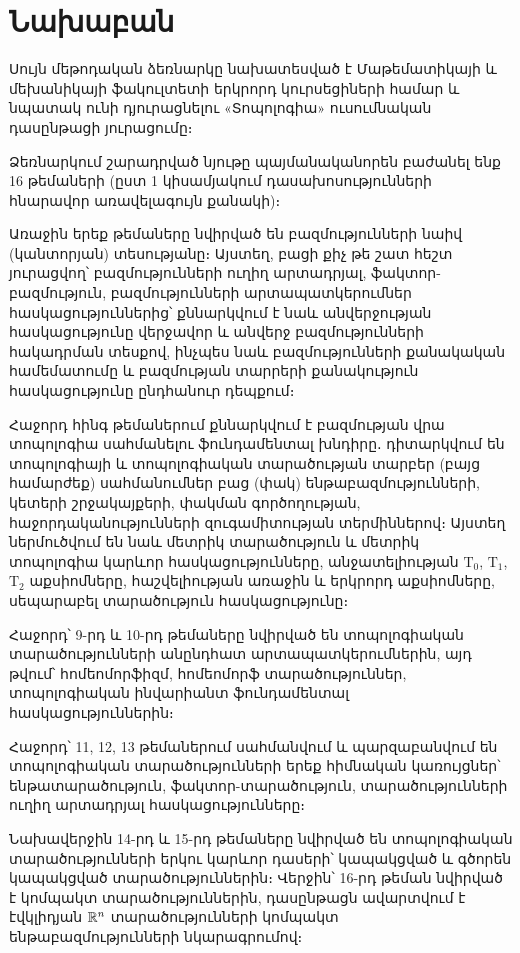 \documentclass[./main.tex]{subfiles}
\begin{document}
\onehalfspacing
\section*{Նախաբան}\label{sec:intro}
\par
Սույն մեթոդական ձեռնարկը նախատեսված է Մաթեմատիկայի և մեխանիկայի ֆակուլտետի երկրորդ կուրսեցիների համար և նպատակ ունի դյուրացնելու «Տոպո\-լոգիա» ուսումնական դասընթացի յուրացումը։
\par Ձեռնարկում շարադրված նյութը պայմանականորեն բաժանել ենք 16 թեմաների (ըստ 1 կիսամյակում դասախոսությունների հնարավոր առավելագույն քանակի)։
\par Առաջին երեք թեմաները նվիրված են բազմությունների նաիվ (կանտորյան) տեսությանը։ Այստեղ, բացի քիչ թե շատ հեշտ յուրացվող՝ բազմությունների ուղիղ արտադրյալ, ֆակտոր-բազմություն, բազմությունների արտապատկերումներ հաս\-կա\-ցու\-թյուն\-ներից՝ քննարկվում է նաև անվերջության հասկացությունը վերջավոր և անվերջ բազմությունների հակադրման տեսքով, ինչպես նաև բազմությունների քանակական համեմատումը և բազմության տարրերի քանակություն հասկացու\-թյունը ընդհանուր դեպքում։
\par Հաջորդ հինգ թեմաներում քննարկվում է բազմության վրա տոպոլոգիա սահմանե\-լու ֆունդամենտալ խնդիրը․ դիտարկվում են տոպոլոգիայի և տոպոլոգիական տա\-րա\-ծու\-թյան տարբեր (բայց համարժեք) սահմանումներ բաց (փակ) ենթա\-բազմու\-թյուն\-ների, կետերի շրջակայքերի, փակման գործողության, հաջորդականություն\-ների զուգամիտության տերմիններով։ Այստեղ ներմուծվում են նաև մետրիկ տարա\-ծու\-թյուն և մետրիկ տոպոլոգիա կարևոր հասկացությունները, անջատելի\-ու\-թյան $\textrm{T}_0$, $\textrm{T}_1$, $\textrm{T}_2$ աքսիոմները, հաշվելիության առաջին և երկրորդ աքսիոմները, սեպա\-րա\-բել տա\-րա\-ծու\-թյուն հասկացությունը։
\par Հաջորդ՝ 9-րդ և 10-րդ թեմաները նվիրված են տոպոլոգիական տարածու\-թյուն\-ների անընդհատ արտապատկերումներին, այդ թվում՝ հոմեոմորֆիզմ, հոմեոմորֆ տարածություններ, տոպոլոգիական ինվարիանտ ֆունդամենտալ հասկացու\-թյուն\-ներին։
\par Հաջորդ՝ 11, 12, 13 թեմաներում սահմանվում և պարզաբանվում են տոպո\-լոգիա\-կան տարածությունների երեք հիմնական կառույցներ՝ ենթատարածություն, ֆակ\-տոր-տարածություն, տարածությունների ուղիղ արտադրյալ հասկացությունները։
\par Նախավերջին 14-րդ և 15-րդ թեմաները նվիրված են տոպոլոգիական տարածու\-թյուն\-ների երկու կարևոր դասերի՝ կապակցված և գծորեն կապակցված տարածու\-թյուն\-ներին։ Վերջին՝ 16-րդ թեման նվիրված է կոմպակտ տարածություններին, դաս\-ընթացն ավարտվում է էվկլիդյան $\mathbb{R}^n$ տարածությունների կոմպակտ ենթա\-բազմու\-թյուն\-ների նկարագրումով։
\end{document}
